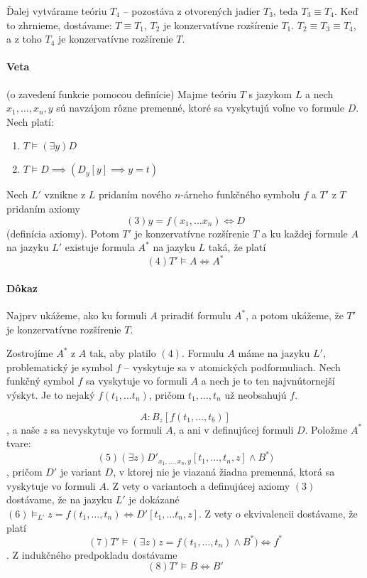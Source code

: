 \par Ďalej vytvárame teóriu $T_4$ -- pozostáva z otvorených jadier $T_3$, teda
$T_3 \equiv T_4$. Keď to zhrnieme, dostávame: $T \equiv T_1$, $T_2$ je
konzervatívne rozšírenie $T_1$. $T_2 \equiv T_3 \equiv T_4$, a z toho $T_4$ je
konzervatívne rozšírenie $T$.

\paragraph{Veta} (o zavedení funkcie pomocou definície) Majme teóriu $T$ s
jazykom $L$ a nech $x_1, \ldots, x_n, y$ sú navzájom rôzne premenné, ktoré sa
vyskytujú voľne vo formule $D$. Nech platí:
\begin{enumerate}
	\item $T\models  (\exists y) D$
	\item $T\models D \implies (D_y[y] \implies y = t)$
\end{enumerate}
Nech $L'$ vznikne z $L$ pridaním nového $n$-árneho funkčného symbolu $f$ a $T'$
z $T$ pridaním axiomy $$(3) y=f(x_1, \ldots x_n) \iff D$$ (definícia axiomy). Potom
$T'$ je konzervatívne rozšírenie $T$ a ku každej formule $A$ na jazyku $L'$
existuje formula $A^*$ na jazyku $L$ taká, že platí $$(4) T' \models A \iff A^*$$

\paragraph{Dôkaz} Najprv ukážeme, ako ku formuli $A$ priradiť formulu $A^*$, a
potom ukážeme, že $T'$ je konzervatívne rozšírenie $T$.

\par Zostrojíme $A^*$ z $A$ tak, aby platilo $(4)$. Formulu $A$ máme na jazyku
$L'$, problematický je symbol $f$ -- vyskytuje sa v atomických podformuliach.
Nech funkčný symbol $f$ sa vyskytuje vo formuli $A$ a nech je to ten
najvnútornejší výskyt. Je to nejaký $f(t_1, \ldots t_n)$, pričom $t_1, \ldots,
t_n$ už neobsahujú $f$. 

$$A: B_z[f(t_1, \ldots, t_b)]$$, a naše $z$ sa nevyskytuje vo formuli $A$, a ani
v definujúcej formuli $D$. Položme $A^*$  tvare:
$$(5) (\exists z) D'_{x_1, \ldots, x_n, y}[t_1, \ldots, t_n, z] \land B^*)$$,
pričom $D'$ je variant $D$, v ktorej nie je viazaná žiadna premenná, ktorá sa
vyskytuje vo formuli $A$. Z vety o variantoch a definujúcej axiomy $(3)$
dostávame, že na jazyku $L'$ je dokázané $ (6) \models_{L'} z = f(t_1, \ldots, t_n) \iff D'[t_1,
\ldots t_n, z]$. Z vety o ekvivalencii dostávame, že platí $$(7) T' \models
(\exists z) z = f(t_1, \ldots, t_n) \land B^*) \iff f^*$$. Z indukčného
predpokladu dostávame $$(8) T' \models B \iff B'$$

